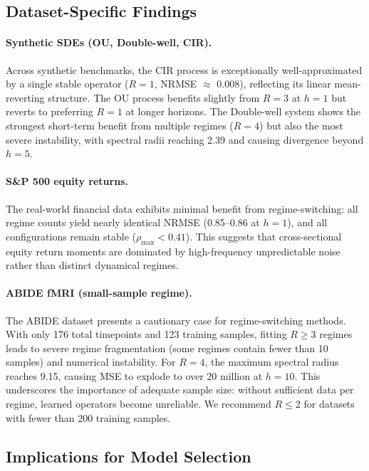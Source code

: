 \documentclass[journal, onecolumn]{IEEEtran}
\begin{document}
\subsection{Dataset-Specific Findings}

\paragraph{Synthetic SDEs (OU, Double-well, CIR).}
Across synthetic benchmarks, the CIR process is exceptionally well-approximated by a single stable operator ($R=1$, NRMSE $\approx$ 0.008), reflecting its linear mean-reverting structure. The OU process benefits slightly from $R=3$ at $h=1$ but reverts to preferring $R=1$ at longer horizons. The Double-well system shows the strongest short-term benefit from multiple regimes ($R=4$) but also the most severe instability, with spectral radii reaching 2.39 and causing divergence beyond $h=5$.

\paragraph{S\&P 500 equity returns.}
The real-world financial data exhibits minimal benefit from regime-switching: all regime counts yield nearly identical NRMSE (0.85--0.86 at $h=1$), and all configurations remain stable ($\rho_{\max} < 0.41$). This suggests that cross-sectional equity return moments are dominated by high-frequency unpredictable noise rather than distinct dynamical regimes.

\paragraph{ABIDE fMRI (small-sample regime).}
The ABIDE dataset presents a cautionary case for regime-switching methods. With only 176 total timepoints and 123 training samples, fitting $R \ge 3$ regimes leads to severe regime fragmentation (some regimes contain fewer than 10 samples) and numerical instability. For $R=4$, the maximum spectral radius reaches 9.15, causing MSE to explode to over 20 million at $h=10$. This underscores the importance of adequate sample size: without sufficient data per regime, learned operators become unreliable. We recommend $R \le 2$ for datasets with fewer than 200 training samples.

\subsection{Implications for Model Selection}
\end{document}
